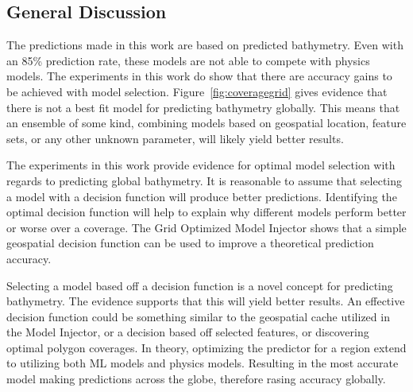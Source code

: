 
\subsection{General Discussion}
The predictions made in this work are based on predicted bathymetry.
Even with an 85\% prediction rate, these models are not able to compete with physics models.
The experiments in this work do show that there are accuracy gains to be achieved with model selection.
Figure~\ref{fig:coveragegrid} gives evidence that there is not a best fit model for predicting bathymetry globally.
This means that an ensemble of some kind, combining models based on geospatial location, feature sets, or any other unknown parameter, will likely yield better results.

The experiments in this work provide evidence for optimal model selection with regards to predicting global bathymetry.
It is reasonable to assume that selecting a model with a decision function will produce better predictions.
Identifying the optimal decision function will help to explain why different models perform better or worse over a coverage.
The Grid Optimized Model Injector shows that a simple geospatial decision function can be used to improve a theoretical prediction accuracy.

Selecting a model based off a decision function is a novel concept for predicting bathymetry.
The evidence supports that this will yield better results.
An effective decision function could be something similar to the geospatial cache utilized in the Model Injector, or a decision based off selected features, or discovering optimal polygon coverages.
In theory, optimizing the predictor for a region extend to utilizing both \ac{ML} models and physics models.
Resulting in the most accurate model making predictions across the globe, therefore rasing accuracy globally.
